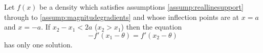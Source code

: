 
		\begin{lemma}
			\label{lem:magnitudegradients}
			Let $f(x)$ be a density which satisfies assumptions \ref{assump:reallinesupport} through to \ref{assump:magnitudegradients} and whose inflection points are at $x=a$ and $x=-a$. If 
			$x_2 - x_1 < 2a$ ($x_2 > x_1$) then the equation
			\begin{equation}
				-f'(x_1 - \theta) = f'(x_2 - \theta)
				\label{eq:gradientsequal}
			\end{equation}
			has only one solution.
		\end{lemma}
